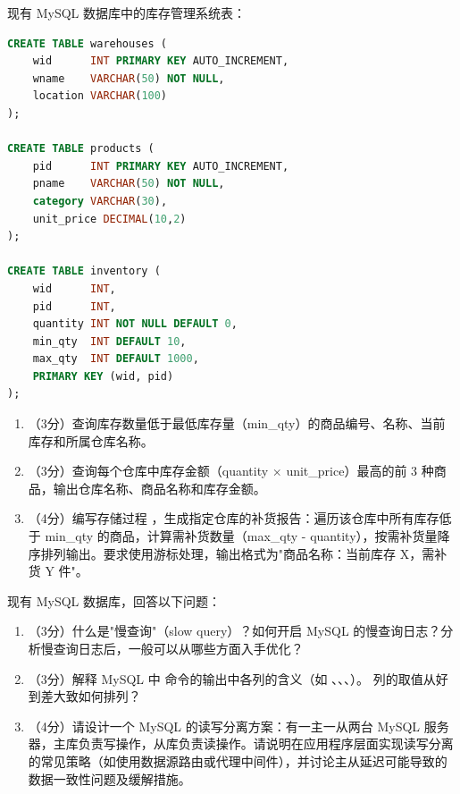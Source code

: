 \documentclass[a4paper,11pt]{article}
\begin{document}

\q 现有 MySQL 数据库中的库存管理系统表：
\begin{lstlisting}[language=SQL]
CREATE TABLE warehouses (
    wid      INT PRIMARY KEY AUTO_INCREMENT,
    wname    VARCHAR(50) NOT NULL,
    location VARCHAR(100)
);

CREATE TABLE products (
    pid      INT PRIMARY KEY AUTO_INCREMENT,
    pname    VARCHAR(50) NOT NULL,
    category VARCHAR(30),
    unit_price DECIMAL(10,2)
);

CREATE TABLE inventory (
    wid      INT,
    pid      INT,
    quantity INT NOT NULL DEFAULT 0,
    min_qty  INT DEFAULT 10,
    max_qty  INT DEFAULT 1000,
    PRIMARY KEY (wid, pid)
);
\end{lstlisting}
\begin{enumerate}[leftmargin=2em, itemsep=3pt]
  \item[（1）] （3分）查询库存数量低于最低库存量（min_qty）的商品编号、名称、当前库存和所属仓库名称。
  \item[（2）] （3分）查询每个仓库中库存金额（quantity $\times$ unit_price）最高的前 3 种商品，输出仓库名称、商品名称和库存金额。
  \item[（3）] （4分）编写存储过程 ，生成指定仓库的补货报告：遍历该仓库中所有库存低于 min_qty 的商品，计算需补货数量（max_qty - quantity），按需补货量降序排列输出。要求使用游标处理，输出格式为"商品名称：当前库存 X，需补货 Y 件"。
\end{enumerate}
\anslines{3.5cm}

\q 现有 MySQL 数据库，回答以下问题：
\begin{enumerate}[leftmargin=2em, itemsep=3pt]
  \item[（1）] （3分）什么是"慢查询"（slow query）？如何开启 MySQL 的慢查询日志？分析慢查询日志后，一般可以从哪些方面入手优化？
  \item[（2）] （3分）解释 MySQL 中  命令的输出中各列的含义（如 、、、）。 列的取值从好到差大致如何排列？
  \item[（3）] （4分）请设计一个 MySQL 的读写分离方案：有一主一从两台 MySQL 服务器，主库负责写操作，从库负责读操作。请说明在应用程序层面实现读写分离的常见策略（如使用数据源路由或代理中间件），并讨论主从延迟可能导致的数据一致性问题及缓解措施。
\end{enumerate}
\anslines{3.5cm}
\end{document}

